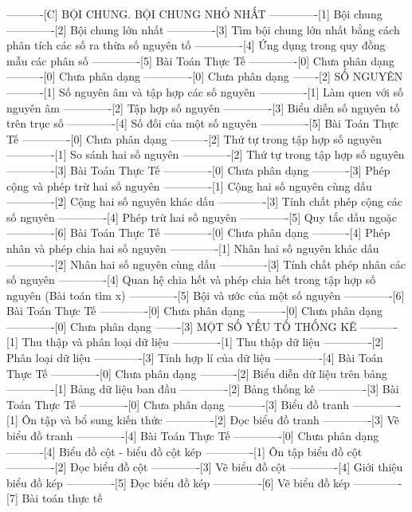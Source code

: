 ----------[C] BỘI CHUNG. BỘI CHUNG NHỎ NHẤT
-------------[1] Bội chung
-------------[2] Bội chung lớn nhất
-------------[3] Tìm bội chung lớn nhất bằng cách phân tích các số ra thừa số nguyên tố
-------------[4] Ứng dụng trong quy đồng mẫu các phân số
-------------[5] Bài Toán Thực Tế
-------------[0] Chưa phân dạng
----------[0] Chưa phân dạng
-------------[0] Chưa phân dạng
-------[2] SỐ NGUYÊN
----------[1] Số nguyên âm và tập hợp các số nguyên
-------------[1] Làm quen với số nguyên âm
-------------[2] Tập hợp số nguyên
-------------[3] Biểu diễn số nguyên tố trên trục số
-------------[4] Số đối của một số nguyên
-------------[5] Bài Toán Thực Tế
-------------[0] Chưa phân dạng
----------[2] Thứ tự trong tập hợp số nguyên
-------------[1] So sánh hai số nguyên
-------------[2] Thứ tự trong tập hợp số nguyên
-------------[3] Bài Toán Thực Tế
-------------[0] Chưa phân dạng
----------[3] Phép cộng và phép trừ hai số nguyên
-------------[1] Cộng hai số nguyên cùng dấu
-------------[2] Cộng hai số nguyên khác dấu
-------------[3] Tính chất phép cộng các số nguyên
-------------[4] Phép trừ hai số nguyên
-------------[5] Quy tắc dấu ngoặc
-------------[6] Bài Toán Thực Tế
-------------[0] Chưa phân dạng
----------[4] Phép nhân và phép chia hai số nguyên
-------------[1] Nhân hai số nguyên khác dấu
-------------[2] Nhân hai số nguyên cùng dấu
-------------[3] Tính chất phép nhân các số nguyên
-------------[4] Quan hệ chia hết và phép chia hết trong tập hợp số nguyên (Bài toán tìm x)
-------------[5] Bội và ước của một số nguyên
-------------[6] Bài Toán Thực Tế
-------------[0] Chưa phân dạng
----------[0] Chưa phân dạng
-------------[0] Chưa phân dạng
-------[3] MỘT SỐ YẾU TỐ THỐNG KÊ
----------[1] Thu thập và phân loại dữ liệu
-------------[1] Thu thập dữ liệu
-------------[2] Phân loại dữ liệu
-------------[3] Tính hợp lí của dữ liệu
-------------[4] Bài Toán Thực Tế
-------------[0] Chưa phân dạng
----------[2] Biểu diễn dữ liệu trên bảng
-------------[1] Bảng dữ liệu ban đầu
-------------[2] Bảng thống kê
-------------[3] Bài Toán Thực Tế
-------------[0] Chưa phân dạng
----------[3] Biểu đồ tranh
-------------[1] Ôn tập và bổ sung kiến thức
-------------[2] Đọc biểu đồ tranh
-------------[3] Vẽ biểu đồ tranh
-------------[4] Bài Toán Thực Tế
-------------[0] Chưa phân dạng
----------[4] Biểu đồ cột - biểu đồ cột kép
-------------[1] Ôn tập biểu đồ cột
-------------[2] Đọc biểu đồ cột
-------------[3] Vẽ biểu đồ cột
-------------[4] Giới thiệu biểu đồ kép
-------------[5] Đọc biểu đồ kép
-------------[6] Vẽ biểu đồ kép
-------------[7] Bài toán thực tế
